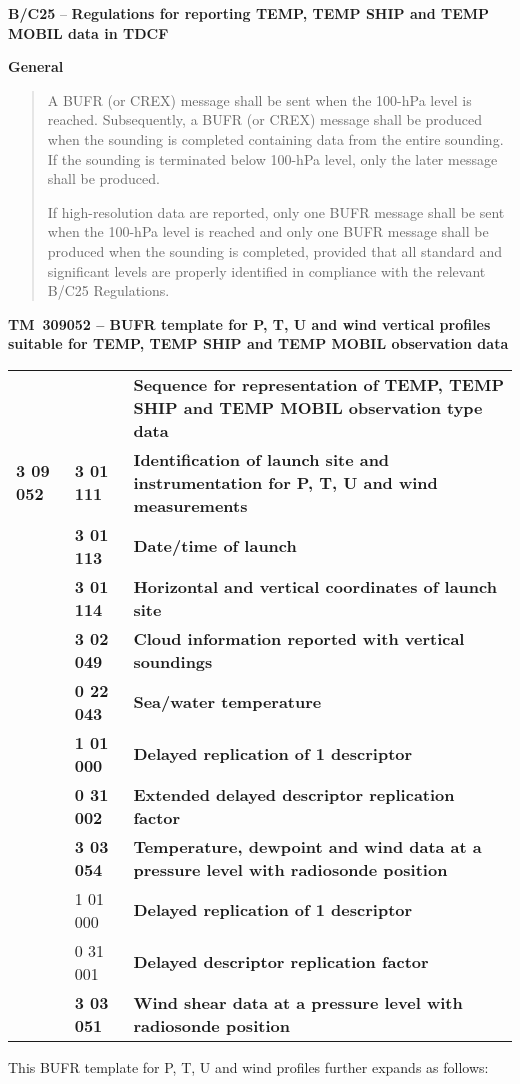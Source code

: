 \textbf{B/C25} -- \textbf{Regulations for reporting TEMP, TEMP SHIP and TEMP MOBIL data in TDCF}

\textbf{General}

\begin{quote}
A BUFR (or CREX) message shall be sent when the 100-hPa level is reached. Subsequently, a BUFR (or CREX) message shall be produced when the sounding is completed containing data from the entire sounding. If the sounding is terminated below 100-hPa level, only the later message shall be produced.

If high-resolution data are reported, only one BUFR message shall be sent when the 100-hPa level is reached and only one BUFR message shall be produced when the sounding is completed, provided that all standard and significant levels are properly identified in compliance with the relevant B/C25 Regulations.
\end{quote}

\textbf{TM~309052 -- BUFR template for P, T, U and wind vertical profiles suitable for TEMP, TEMP SHIP and TEMP MOBIL observation data}

\begin{longtable}[]{@{}lll@{}}
\toprule
\endhead
& & \textbf{Sequence for representation of TEMP, TEMP SHIP and TEMP MOBIL observation type data}\tabularnewline
\textbf{3 09 052} & \textbf{3 01 111} & \textbf{Identification of launch site and instrumentation for P, T, U and wind measurements}\tabularnewline
& \textbf{3 01 113} & \textbf{Date/time of launch}\tabularnewline
& \textbf{3 01 114} & \textbf{Horizontal and vertical coordinates of launch site}\tabularnewline
& \textbf{3 02 049} & \textbf{Cloud information reported with vertical soundings}\tabularnewline
& \textbf{0 22 043} & \textbf{Sea/water temperature}\tabularnewline
& \textbf{1 01 000} & \textbf{Delayed replication of 1 descriptor}\tabularnewline
& \textbf{0 31 002} & \textbf{Extended delayed descriptor replication factor}\tabularnewline
& \textbf{3 03 054} & \textbf{Temperature, dewpoint and wind data at a pressure level with radiosonde position}\tabularnewline
& 1 01 000 & \textbf{Delayed replication of 1 descriptor}\tabularnewline
& 0 31 001 & \textbf{Delayed descriptor replication factor}\tabularnewline
& \textbf{3 03 051} & \textbf{Wind shear data at a pressure level with radiosonde position}\tabularnewline
\bottomrule
\end{longtable}

This BUFR template for P, T, U and wind profiles further expands as follows:

